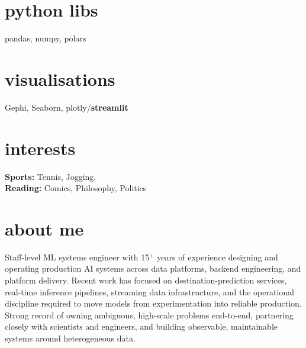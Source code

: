 \documentclass[]{../../friggeri-cv}
\begin{document}
\begin{aside}
    \section{python libs}
    	{\footnotesize pandas, numpy, polars}
    \section{visualisations}
    	{\footnotesize Gephi, Seaborn, plotly/\textbf{streamlit}}
    \section{interests}
		{\footnotesize \textbf{Sports:} Tennis, Jogging, \\ \textbf{Reading:} Comics, Philosophy, Politics}
\end{aside}

\section{about me}
{\small Staff-level ML systems engineer with 15${^+}$ years of experience designing and operating production AI systems across data platforms, backend engineering, and platform delivery. Recent work has focused on destination-prediction services, real-time inference pipelines, streaming data infrastructure, and the operational discipline required to move models from experimentation into reliable production. Strong record of owning ambiguous, high-scale problems end-to-end, partnering closely with scientists and engineers, and building observable, maintainable systems around heterogeneous data.}
\end{document}
